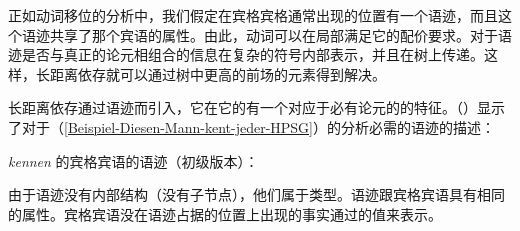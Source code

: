 正如动词移位的分析中，我们假定在宾格宾格通常出现的位置有一个语迹，而且这个语迹共享了那个宾语的属性。由此，动词可以在局部满足它的配价要求。对于语迹是否与真正的论元相组合的信息在复杂的符号内部表示，并且在树上传递。这样，长距离依存就可以通过树中更高的前场的元素得到解决。

长距离依存通过语迹而引入，它在它的\slashl 有一个对应于必有论元的\localv 的特征。（）显示了对于（\ref{Beispiel-Diesen-Mann-kent-jeder-HPSG}）的分析必需的语迹的描述：

\eas
\label{le-spur-acc-o-kennen}
\emph{kennen} 的宾格宾语的语迹（初级版本）：\\
\zs

\noindent
由于语迹没有内部结构（没有子节点），他们属于类型。语迹跟宾格宾语具有相同的属性。宾格宾语没在语迹占据的位置上出现的事实通过\slasch 的值来表示。 
%

